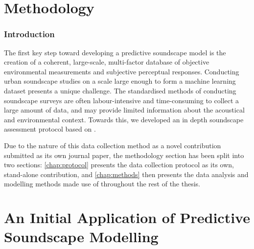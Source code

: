 \documentclass[oneside,fontsize=11pt,titlepage,chapterprefix=true
]{scrbook}
\begin{document}
\newpage
\glsnogroupskiptrue
\printglossary[style=long]

\newpage
\listoffigures

\newpage
\listoftables


\mainmatter





\part{Methodology}
\label{part:Methodology}

\section*{Introduction}
The first key step toward developing a predictive soundscape model is the creation of a coherent, large-scale, multi-factor database of objective environmental measurements and subjective perceptual responses. Conducting urban soundscape studies on a scale large enough to form a machine learning dataset presents a unique challenge. The standardised methods of conducting soundscape surveys \citep{ISO12913Part2} are often labour-intensive and time-consuming to collect a large amount of data, and may provide limited information about the acoustical and environmental context. Towards this, we developed an in depth soundscape assessment protocol based on \citet{ISO12913Part2}. 

Due to the nature of this data collection method as a novel contribution submitted as its own journal paper, the methodology section has been split into two sections: \cref{chap:protocol} presents the data collection protocol as its own, stand-alone contribution, and \cref{chap:methods} then presents the data analysis and modelling methods made use of throughout the rest of the thesis. 





\part{An Initial Application of Predictive Soundscape Modelling}
\label{part:Lockdown}
\end{document}
